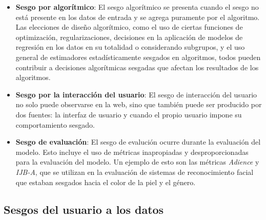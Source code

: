     \begin{itemize}
        \item \textbf{Sesgo por algor\'itmico}: El sesgo algor\'itmico se presenta cuando el sesgo no est\'a presente en los datos de entrada
        y se agrega puramente por el algoritmo. Las elecciones de dise\~no algor\'itmico, como el uso de ciertas funciones de optimizaci\'on, 
        regularizaciones, decisiones en la aplicaci\'on de modelos de regresi\'on en los datos en su totalidad o considerando subgrupos, y el uso
        general de estimadores estad\'isticamente sesgados en algoritmos, todos pueden contribuir a decisiones algor\'itmicas sesgadas que 
        afectan los resultados de los algoritmos. 
        
        \item \textbf{Sesgo por la interacci\'on del usuario}: El sesgo de interacci\'on del usuario no solo puede observarse en la web, sino que 
        tambi\'en puede ser producido por dos fuentes: la interfaz de usuario y cuando el propio usuario impone su comportamiento sesgado.
        
        \item \textbf{Sesgo de evaluaci\'on}: El sesgo de evaluci\'on ocurre durante la evaluaci\'on del modelo. Esto incluye el uso de m\'etricas
        inapropiadas y desproporcionadas para la evaluaci\'on del modelo. Un ejemplo de esto son las m\'etricas \textit{Adience} y \textit{IJB-A}, 
        que se utilizan en la evaluaci\'on de sistemas de reconocimiento facial que estaban sesgados hacia el color de la piel y el g\'enero.
    \end{itemize}
    
    \subsection{Sesgos del usuario a los datos}

